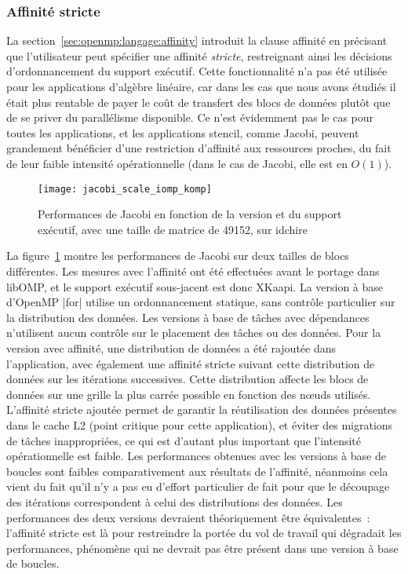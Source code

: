 


\subsubsection{Affinité stricte}

La section~\ref{sec:openmp:langage:affinity} introduit la clause affinité en précisant que l'utilisateur peut spécifier une affinité \emph{stricte}, restreignant ainsi les décisions d'ordonnancement du support exécutif.
Cette fonctionnalité n'a pas été utilisée pour les applications d'algèbre linéaire, car dans les cas que nous avons étudiés il était plus rentable de payer le coût de transfert des blocs de données plutôt que de se priver du parallélisme disponible.
Ce n'est évidemment pas le cas pour toutes les applications, et les applications stencil, comme Jacobi, peuvent grandement bénéficier d'une restriction d'affinité aux ressources proches, du fait de leur faible intensité opérationnelle (dans le cas de Jacobi, elle est en $O(1)$).

\begin{figure}[ht]
  \centering
  \texttt{[image: jacobi\_scale\_iomp\_komp]}
  \caption{Performances de Jacobi en fonction de la version et du support exécutif, avec une taille de matrice de 49152, sur idchire}\label{fig:contribs:perf_eval:eval-jacobi}
\end{figure}

La figure~\ref{fig:contribs:perf_eval:eval-jacobi} montre les performances de Jacobi sur deux tailles de blocs différentes.
Les mesures avec l'affinité ont été effectuées avant le portage dans libOMP, et le support exécutif sous-jacent est donc XKaapi.
La version à base d'OpenMP |for| utilise un ordonnancement statique, sans contrôle particulier sur la distribution des données.
Les versions à base de tâches avec dépendances n'utilisent aucun contrôle sur le placement des tâches ou des données.
Pour la version avec affinité, une distribution de données a été rajoutée dans l'application, avec également une affinité stricte suivant cette distribution de données sur les itérations successives.
Cette distribution affecte les blocs de données sur une grille la plus carrée possible en fonction des nœuds utilisés.
L'affinité stricte ajoutée permet de garantir la réutilisation des données présentes dans le cache L2 (point critique pour cette application), et éviter des migrations de tâches inappropriées, ce qui est d'autant plus important que l'intensité opérationnelle est faible.
Les performances obtenues avec les versions à base de boucles sont faibles comparativement aux résultats de l'affinité, néanmoins cela vient du fait qu'il n'y a pas eu d'effort particulier de fait pour que le découpage des itérations correspondent à celui des distributions des données.
Les performances des deux versions devraient théoriquement être équivalentes~: l'affinité stricte est là pour restreindre la portée du vol de travail qui dégradait les performances, phénomène qui ne devrait pas être présent dans une version à base de boucles.
